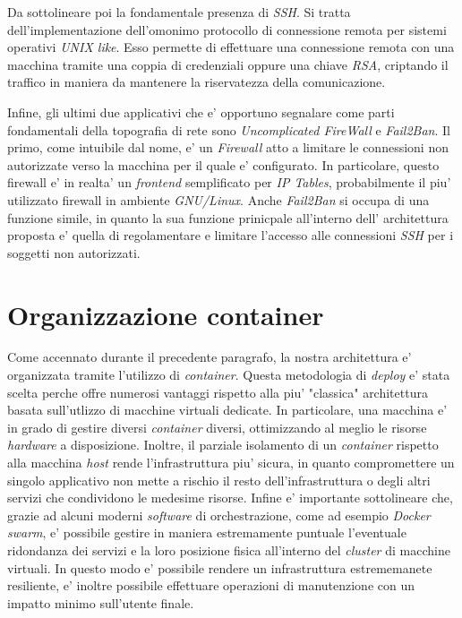 \documentclass[a4paper]{report}
\begin{document}
		Da sottolineare poi la fondamentale presenza di \emph{SSH}. Si tratta dell'implementazione dell'omonimo 
		protocollo di connessione remota per sistemi operativi \emph{UNIX like}. Esso permette di effettuare una
		connessione remota con una macchina tramite una coppia di credenziali oppure una chiave \emph{RSA}, criptando
		il traffico in maniera da mantenere la riservatezza della comunicazione.

		Infine, gli ultimi due applicativi che e' opportuno segnalare come parti fondamentali della topografia di rete
		sono \emph{Uncomplicated FireWall} e \emph{Fail2Ban}. Il primo, come intuibile dal nome, e' un \emph{Firewall}
		atto a limitare le connessioni non autorizzate verso la macchina per il quale e' configurato. In particolare,
		questo firewall e' in realta' un \emph{frontend} semplificato per \emph{IP Tables}, probabilmente il piu'
		utilizzato firewall in ambiente \emph{GNU/Linux}.
		Anche \emph{Fail2Ban} si occupa di una funzione simile, in quanto la sua funzione prinicpale all'interno dell'
		architettura proposta e' quella di regolamentare e limitare l'accesso alle connessioni \emph{SSH} per i soggetti
		non autorizzati.
 
	\section{Organizzazione container}
		Come accennato durante il precedente paragrafo, la nostra architettura e' organizzata tramite l'utilizzo di
		\emph{container}. Questa metodologia di  \emph{deploy} e' stata scelta perche offre numerosi vantaggi rispetto
		alla piu' "classica" architettura basata sull'utlizzo di macchine virtuali dedicate. In particolare, una
		macchina e' in grado di gestire diversi \emph{container} diversi, ottimizzando al meglio le risorse
		\emph{hardware} a disposizione. Inoltre, il parziale isolamento di un \emph{container} rispetto alla macchina
		\emph{host} rende l'infrastruttura piu' sicura, in quanto compromettere un singolo applicativo non mette a
		rischio il resto dell'infrastruttura o degli altri servizi che condividono le medesime risorse.
		Infine e' importante sottolineare che, grazie ad alcuni moderni \emph{software} di orchestrazione, come ad
		esempio \emph{Docker swarm}, e' possibile gestire in maniera estremamente puntuale l'eventuale ridondanza dei
		servizi e la loro posizione fisica all'interno del \emph{cluster} di macchine virtuali.
		In questo modo e' possibile rendere un infrastruttura estrememanete resiliente, e' inoltre possibile
		effettuare operazioni di manutenzione con un impatto minimo sull'utente finale.
\end{document}
